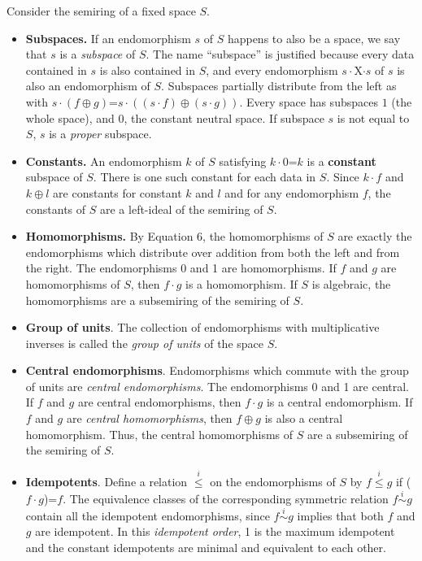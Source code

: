 \documentclass[11pt]{article}
\begin{document}
Consider the semiring of a fixed space $S$.  
\begin{itemize}

\item{{\bf Subspaces.} If an endomorphism $s$ of $S$ happens to also be a space, we say that $s$ is a {\it subspace} of $S$.  The name ``subspace'' is justified because every data contained in $s$ is also contained in $S$, and every endomorphism $s\cdot$X$\cdot s$ of $s$ is also an endomorphism of $S$.  
Subspaces partially distribute from the left as with $s\cdot(f\oplus g)$=$s\cdot((s\cdot f)\oplus(s\cdot g))$.
Every space has subspaces $1$ (the whole space), and $0$, the constant neutral space.  If subspace $s$ is not equal to $S$, $s$ is a {\it proper} subspace.} 

\item{{\bf Constants.}  An endomorphism $k$ of $S$ satisfying $k\cdot 0$=$k$ is a {\bf constant} subspace of $S$.  There is one such constant for each 
data in $S$.  Since $k\cdot f$ and $k\oplus l$ are constants for 
constant $k$ and $l$ and for any endomorphism $f$, the constants of $S$ are a left-ideal of the semiring of $S$.} 

\item{{\bf Homomorphisms.}  By Equation 6, the homomorphisms of $S$ are exactly the endomorphisms which distribute over addition from
both the left and from the right.  The endomorphisms 0 and 1 are homomorphisms.  If $f$ and $g$ are homomorphisms of $S$, then 
$f\cdot g$ is a homomorphism.  If $S$ is algebraic, the homomorphisms are a subsemiring of the semiring of $S$.} 

\item {{\bf Group of units}. The collection of endomorphisms with multiplicative inverses is called the {\it group of units} of the space $S$.} 

\item{{\bf Central endomorphisms}.  Endomorphisms which commute with the group of units are {\it central endomorphisms}.  The endomorphisms 0 and 1 
are central.  If $f$ and $g$ are central endomorphisms, then $f\cdot g$ is a central endomorphism.  If $f$ and $g$ are {\it central homomorphisms}, then 
$f\oplus g$ is also a central homomorphism.  Thus, the central homomorphisms of $S$ are a subsemiring of the semiring of $S$.}

\item{{\bf Idempotents}.  Define a relation ${\overset i \leq}$ on the endomorphisms of $S$ by $f{\overset i \leq}g$ if ($f\cdot g$)=$f$.  The equivalence 
classes of the corresponding symmetric relation $f{\overset i \sim} g$ contain all the idempotent endomorphisms, since $f{\overset i\sim}g$ implies that 
both $f$ and $g$ are idempotent.  In this {\it idempotent order}, 1 is the maximum idempotent and the constant idempotents are minimal and equivalent to each other.}


\end{itemize}
\end{document}
